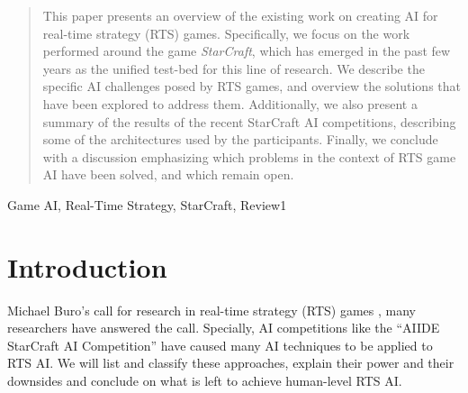 \documentclass[journal]{IEEEtran}
\begin{document}
\maketitle

\begin{abstract}
This paper presents an overview of the existing work on creating AI for real-time strategy (RTS) games. Specifically, we focus on the work performed around the game {\em StarCraft}, which has emerged in the past few years as the unified test-bed for this line of research. We describe the specific AI challenges posed by RTS games, and overview the solutions that have been explored to address them. Additionally, we also present a summary of the results of the recent StarCraft AI competitions, describing some of the architectures used by the participants. Finally, we conclude with a discussion emphasizing which problems in the context of RTS game AI have been solved, and which remain open.
\end{abstract}

\begin{IEEEkeywords}
Game AI, Real-Time Strategy, StarCraft, Review1

\end{IEEEkeywords}

%
\IEEEpeerreviewmaketitle

\section{Introduction}\label{sec:intro}
 Michael Buro's call for research in real-time strategy (RTS) games \cite{Buro03rts}, many researchers have answered the call. Specially, AI competitions like the ``AIIDE StarCraft AI Competition'' have caused many AI techniques to be
applied to RTS AI. We will list and classify these approaches, explain their 
power and their downsides and conclude on what is left to achieve human-level 
RTS AI.
\end{document}
